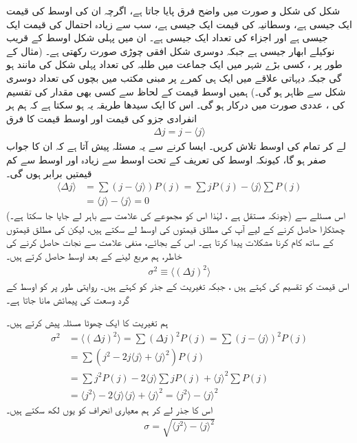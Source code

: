 شکل  کی شکل و صورت میں واضح فرق پایا جاتا ہے،  اگرچہ ان کی اوسط کی قیمت ایک  جیسی  ہے، وسطانیہ کی قیمت ایک جیسی  ہے، سب سے زیادہ احتمال کی قیمت ایک  جیسی ہے اور اجزاء کی تعداد ایک  جیسی ہے۔ ان میں پہلی شکل اوسط کے قریب نوکیلے ابھار جیسی ہے جبکہ دوسری شکل افقی چوڑی صورت رکھتی ہے۔ (مثال کے طور پر ، کسی بڑے شہر میں ایک جماعت میں طلبہ کی تعداد پہلی شکل کی مانند ہو گی جبکہ دیہاتی علاقے میں ایک ہی کمرے پر مبنی مکتب میں بچوں کی تعداد دوسری شکل سے ظاہر ہو گی۔) ہمیں اوسط قیمت کے لحاظ سے کسی بھی مقدار کی تقسیم کی ، عددی صورت میں درکار ہو گی۔ اس کا ایک سیدھا طریقہ یہ ہو سکتا ہے کہ ہم ہر انفرادی جزو کی قیمت اور اوسط قیمت کا فرق
\begin{align}
\Delta j = j-\langle j \rangle 
\end{align}
لے کر تمام  کی اوسط تلاش کریں۔ ایسا کرنے سے یہ مسئلہ پیش آتا ہے کہ ان کا جواب صفر ہو گا،  کیونکہ اوسط کی تعریف کے تحت اوسط سے زیادہ اور اوسط سے کم قیمتیں  برابر ہوں گی۔ 
\begin{align*}
\langle \Delta j \rangle &= \sum \left( j - \langle j \rangle \right) P(j) = \sum jP(j) - \langle j \rangle \sum P(j) \\
 &= \langle j \rangle - \langle j \rangle = 0
\end{align*}
(چونکہ  مستقل ہے ، لہٰذا اس کو مجموعے کی علامت سے باہر لے جایا جا سکتا ہے۔) اس مسئلے سے چھٹکارا حاصل کرنے کے لیے آپ  کی مطلق قیمتوں کی اوسط لے سکتے ہیں،  لیکن  کی مطلق قیمتوں کے ساتھ کام کرنا مشکلات پیدا کرتا ہے۔ اس کے بجائے، منفی علامت سے نجات حاصل کرنے کی خاطر، ہم مربع لینے کے بعد اوسط حاصل کرتے ہیں۔
\begin{align} \label{مساوات_تفاعل_موج_تعریف_معیاری_احتمال_الف}
 \sigma^{2} \equiv \langle \left( \Delta j \right)^{2} \rangle 
\end{align}
اس قیمت کو تقسیم کی  کہتے ہیں ، جبکہ تغیریت کے جذر  کو  کہتے ہیں۔ روایتی طور پر  کو اوسط  کے گرد وسعت کی پیمائش مانا جاتا ہے۔

 ہم تغیریت کا ایک چھوٹا مسئلہ پیش کرتے ہیں۔ 
\begin{align*}
\sigma^{2} &= \langle ( \Delta j )^{2} \rangle = \sum ( \Delta j )^{2} P(j) = \sum (j- \langle j \rangle )^{2} P(j) \\
&= \sum (j^{2} -2j \langle j \rangle + \langle j \rangle ^{2} ) P(j) \\ 
&= \sum j^{2} P(j) -2 \langle j \rangle \sum jP(j) + \langle j \rangle ^{2} \sum P(j) \\ 
&= \langle j^{2}\rangle -2\langle j \rangle \langle j \rangle + \langle j \rangle ^{2} = \langle j^{2} \rangle - \langle j \rangle ^{2}
\end{align*}
اس کا جذر لے کر ہم معیاری انحراف کو یوں لکھ سکتے ہیں۔ 
\begin{align}\label{مساوات_تفاعل_موج_تعریف_معیاری_احتمال_ب}
 \sigma = \sqrt{\langle j^{2} \rangle - \langle j \rangle ^{2}} 
\end{align}


